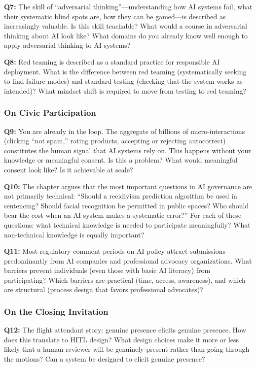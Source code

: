 \textbf{Q7:} The skill of ``adversarial thinking''---understanding how AI systems fail, what their systematic blind spots are, how they can be gamed---is described as increasingly valuable. Is this skill teachable? What would a course in adversarial thinking about AI look like? What domains do you already know well enough to apply adversarial thinking to AI systems?

\textbf{Q8:} Red teaming is described as a standard practice for responsible AI deployment. What is the difference between red teaming (systematically seeking to find failure modes) and standard testing (checking that the system works as intended)? What mindset shift is required to move from testing to red teaming?

\subsubsection*{On Civic Participation}

\textbf{Q9:} You are already in the loop. The aggregate of billions of micro-interactions (clicking ``not spam,'' rating products, accepting or rejecting autocorrect) constitutes the human signal that AI systems rely on. This happens without your knowledge or meaningful consent. Is this a problem? What would meaningful consent look like? Is it achievable at scale?

\textbf{Q10:} The chapter argues that the most important questions in AI governance are not primarily technical: ``Should a recidivism prediction algorithm be used in sentencing? Should facial recognition be permitted in public spaces? Who should bear the cost when an AI system makes a systematic error?'' For each of these questions: what technical knowledge is needed to participate meaningfully? What non-technical knowledge is equally important?

\textbf{Q11:} Most regulatory comment periods on AI policy attract submissions predominantly from AI companies and professional advocacy organizations. What barriers prevent individuals (even those with basic AI literacy) from participating? Which barriers are practical (time, access, awareness), and which are structural (process design that favors professional advocates)?

\subsubsection*{On the Closing Invitation}

\textbf{Q12:} The flight attendant story: genuine presence elicits genuine presence. How does this translate to HITL design? What design choices make it more or less likely that a human reviewer will be genuinely present rather than going through the motions? Can a system be designed to elicit genuine presence?

